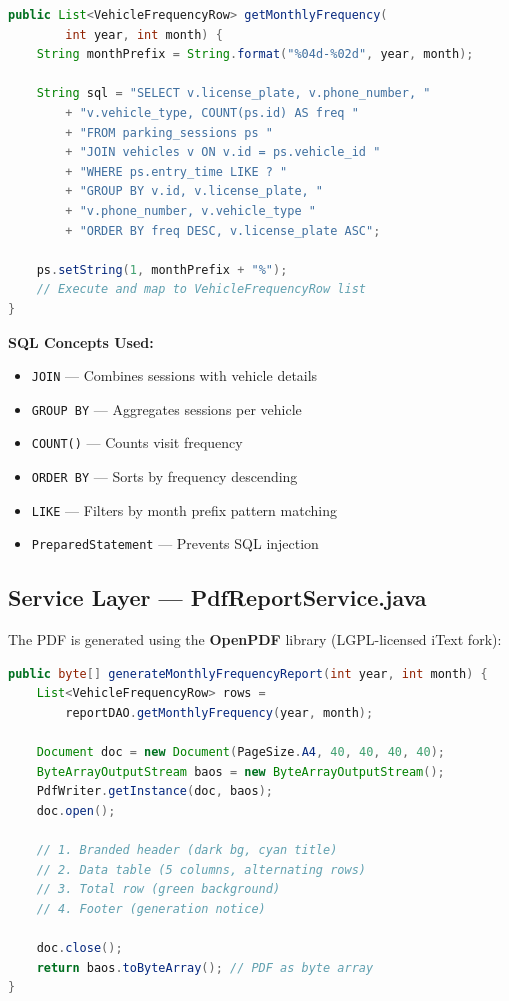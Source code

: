 \documentclass[12pt,a4paper]{article}
\begin{document}
\begin{lstlisting}[language=Java, caption={Monthly Frequency SQL Query}]
public List<VehicleFrequencyRow> getMonthlyFrequency(
        int year, int month) {
    String monthPrefix = String.format("%04d-%02d", year, month);
    
    String sql = "SELECT v.license_plate, v.phone_number, "
        + "v.vehicle_type, COUNT(ps.id) AS freq "
        + "FROM parking_sessions ps "
        + "JOIN vehicles v ON v.id = ps.vehicle_id "
        + "WHERE ps.entry_time LIKE ? "
        + "GROUP BY v.id, v.license_plate, "
        + "v.phone_number, v.vehicle_type "
        + "ORDER BY freq DESC, v.license_plate ASC";
    
    ps.setString(1, monthPrefix + "%");
    // Execute and map to VehicleFrequencyRow list
}
\end{lstlisting}

\textbf{SQL Concepts Used:}
\begin{itemize}[noitemsep]
    \item \texttt{JOIN} — Combines sessions with vehicle details
    \item \texttt{GROUP BY} — Aggregates sessions per vehicle
    \item \texttt{COUNT()} — Counts visit frequency
    \item \texttt{ORDER BY} — Sorts by frequency descending
    \item \texttt{LIKE} — Filters by month prefix pattern matching
    \item \texttt{PreparedStatement} — Prevents SQL injection
\end{itemize}

\subsection{Service Layer — PdfReportService.java}
The PDF is generated using the \textbf{OpenPDF} library (LGPL-licensed iText fork):

\begin{lstlisting}[language=Java, caption={PDF Generation Core Logic}]
public byte[] generateMonthlyFrequencyReport(int year, int month) {
    List<VehicleFrequencyRow> rows = 
        reportDAO.getMonthlyFrequency(year, month);
    
    Document doc = new Document(PageSize.A4, 40, 40, 40, 40);
    ByteArrayOutputStream baos = new ByteArrayOutputStream();
    PdfWriter.getInstance(doc, baos);
    doc.open();
    
    // 1. Branded header (dark bg, cyan title)
    // 2. Data table (5 columns, alternating rows)
    // 3. Total row (green background)
    // 4. Footer (generation notice)
    
    doc.close();
    return baos.toByteArray(); // PDF as byte array
}
\end{lstlisting}
\end{document}
